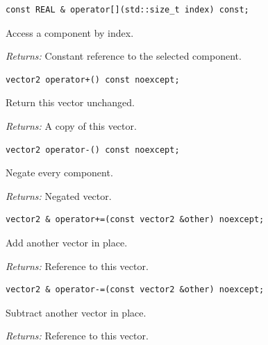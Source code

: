 \par\noindent\begin{minipage}{\linewidth}
\begin{lstlisting}[style=apireference]
const REAL & operator[](std::size_t index) const;
\end{lstlisting}
{\footnotesize Access a component by index.\par}
{\footnotesize\textit{Returns:} Constant reference to the selected component.\par}
\end{minipage}\par\vspace{1pt}
\par\noindent\begin{minipage}{\linewidth}
\begin{lstlisting}[style=apireference]
vector2 operator+() const noexcept;
\end{lstlisting}
{\footnotesize Return this vector unchanged.\par}
{\footnotesize\textit{Returns:} A copy of this vector.\par}
\end{minipage}\par\vspace{1pt}
\par\noindent\begin{minipage}{\linewidth}
\begin{lstlisting}[style=apireference]
vector2 operator-() const noexcept;
\end{lstlisting}
{\footnotesize Negate every component.\par}
{\footnotesize\textit{Returns:} Negated vector.\par}
\end{minipage}\par\vspace{1pt}
\par\noindent\begin{minipage}{\linewidth}
\begin{lstlisting}[style=apireference]
vector2 & operator+=(const vector2 &other) noexcept;
\end{lstlisting}
{\footnotesize Add another vector in place.\par}
{\footnotesize\textit{Returns:} Reference to this vector.\par}
\end{minipage}\par\vspace{1pt}
\par\noindent\begin{minipage}{\linewidth}
\begin{lstlisting}[style=apireference]
vector2 & operator-=(const vector2 &other) noexcept;
\end{lstlisting}
{\footnotesize Subtract another vector in place.\par}
{\footnotesize\textit{Returns:} Reference to this vector.\par}
\end{minipage}\par\vspace{1pt}
